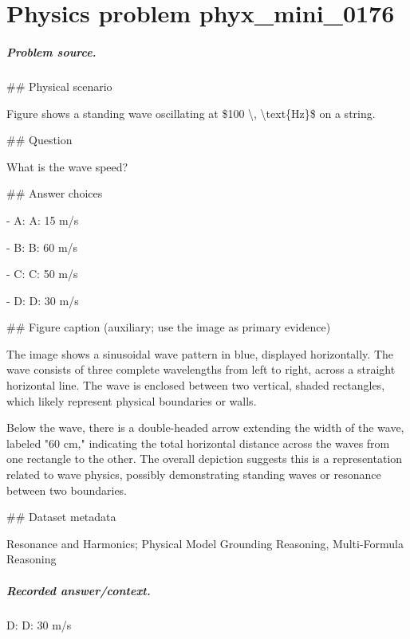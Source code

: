 
\chapter{Physics problem phyx\_mini\_0176}
\label{ch:PhyXMiniProblems_problem_phyx_mini_0176}

\paragraph{Problem source.}
\#\# Physical scenario

Figure shows a standing wave oscillating at \$100 \textbackslash{}, \textbackslash{}text\{Hz\}\$ on a string.

\#\# Question

What is the wave speed?

\#\# Answer choices

- A: A: 15 m/s

- B: B: 60 m/s

- C: C: 50 m/s

- D: D: 30 m/s

\#\# Figure caption (auxiliary; use the image as primary evidence)

The image shows a sinusoidal wave pattern in blue, displayed horizontally. The wave consists of three complete wavelengths from left to right, across a straight horizontal line. The wave is enclosed between two vertical, shaded rectangles, which likely represent physical boundaries or walls.

Below the wave, there is a double-headed arrow extending the width of the wave, labeled "60 cm," indicating the total horizontal distance across the waves from one rectangle to the other. The overall depiction suggests this is a representation related to wave physics, possibly demonstrating standing waves or resonance between two boundaries.

\#\# Dataset metadata

Resonance and Harmonics; Physical Model Grounding Reasoning, Multi-Formula Reasoning

\paragraph{Recorded answer/context.}
D: D: 30 m/s

